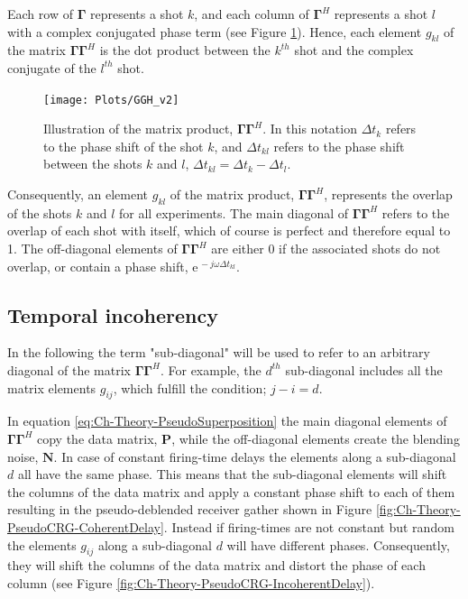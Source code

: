 Each row of $\mathbf{\Gamma}$ represents a shot $k$, and each column of $\mathbf{\Gamma}^H$ represents a shot $l$ with a complex conjugated phase term (see Figure \ref{fig:Ch-Theory-GGH}). Hence, each element $g_{kl}$ of the matrix $\mathbf{\Gamma \Gamma}^H$ is the dot product between the $k^{th}$ shot and the complex conjugate of the $l^{th}$ shot.

\begin{figure}
	\centering
	\texttt{[image: Plots/GGH\_v2]}
	\caption{Illustration of the matrix product, $\mathbf{\Gamma \Gamma}^H$. In this notation $\Delta t_k$ refers to the phase shift of the shot $k$, and $\Delta t_{kl}$ refers to the phase shift between the shots $k$ and $l$, $\Delta t_{kl} = \Delta t_k - \Delta t_l$.}
	\label{fig:Ch-Theory-GGH}
\end{figure}

Consequently, an element $g_{kl}$ of the matrix product, $\mathbf{\Gamma \Gamma}^H$, represents the overlap of the shots $k$ and $l$ for all experiments. The main diagonal of $\mathbf{\Gamma \Gamma}^H$ refers to the overlap of each shot with itself, which of course is perfect and therefore equal to 1. The off-diagonal elements of $\mathbf{\Gamma \Gamma}^H$ are either 0 if the associated shots do not overlap, or contain a phase shift, $\mathrm{e}^{\, -j \omega \Delta t_{kl}}$.

\subsection*{Temporal incoherency}

In the following the term "sub-diagonal" will be used to refer to an arbitrary diagonal of the matrix $\mathbf{\Gamma \Gamma}^H$. For example, the $d^{th}$ sub-diagonal includes all the matrix elements $g_{ij}$, which fulfill the condition; $j -i = d$.

In equation \ref{eq:Ch-Theory-PseudoSuperposition} the main diagonal elements of $\mathbf{\Gamma \Gamma}^H$ copy the data matrix, $\mathbf{P}$, while the off-diagonal elements create the blending noise, $\mathbf{N}$. In case of constant firing-time delays the elements along a sub-diagonal $d$ all have the same phase. This means that the sub-diagonal elements will shift the columns of the data matrix and apply a constant phase shift to each of them resulting in the pseudo-deblended receiver gather shown in Figure \ref{fig:Ch-Theory-PseudoCRG-CoherentDelay}. Instead if firing-times are not constant but random the elements $g_{ij}$ along a sub-diagonal $d$ will have different phases. Consequently, they will shift the columns of the data matrix and distort the phase of each column (see Figure \ref{fig:Ch-Theory-PseudoCRG-IncoherentDelay}). 

